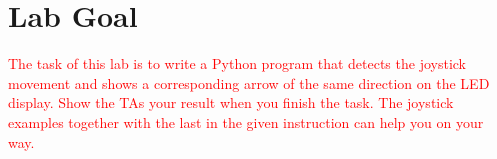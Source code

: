 \documentclass{article}
\begin{document}
\section{Lab Goal}
{\textcolor{red}{The task of this lab is to write a Python program that detects the joystick movement and shows a corresponding arrow of the same direction on the LED display. Show the TAs your result when you finish the task. The joystick examples together with the last {} in the given instruction can help you on your way.}








}
\end{document}
